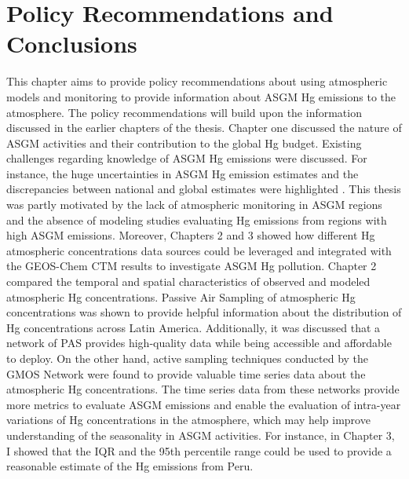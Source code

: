 
\chapter{Policy Recommendations and Conclusions}
\begin{flushleft}
    

This chapter aims to provide policy recommendations about using atmospheric models and monitoring to provide information about ASGM Hg emissions to the atmosphere. The policy recommendations will build upon the information discussed in the earlier chapters of the thesis. Chapter one discussed the nature of ASGM activities and their contribution to the global Hg budget. Existing challenges regarding knowledge of ASGM Hg emissions were discussed. For instance, the huge uncertainties in ASGM Hg emission estimates and the discrepancies between national and global estimates were highlighted \cite{united_nations_environment_programme_technical_2019,agc_reporte_2017}. This thesis was partly motivated by the lack of atmospheric monitoring in ASGM regions and the absence of modeling studies evaluating Hg emissions from regions with high ASGM emissions.
Moreover, Chapters 2 and 3 showed how different Hg atmospheric concentrations data sources could be leveraged and integrated with the GEOS-Chem CTM results to investigate ASGM Hg pollution. Chapter 2 compared the temporal and spatial characteristics of observed and modeled atmospheric Hg concentrations. Passive Air Sampling of atmospheric Hg concentrations was shown to provide helpful information about the distribution of Hg concentrations across Latin America. Additionally, it was discussed that a network of PAS provides high-quality data while being accessible and affordable to deploy\cite{quant_measuring_2021}.  On the other hand, active sampling techniques conducted by the GMOS Network were found to provide valuable time series data about the atmospheric Hg concentrations. The time series data from these networks provide more metrics to evaluate ASGM emissions and enable the evaluation of intra-year variations of Hg concentrations in the atmosphere, which may help improve understanding of the seasonality in ASGM activities. For instance, in Chapter 3, I showed that the IQR and the 95th percentile range could be used to provide a reasonable estimate of the Hg emissions from Peru. 
\end{flushleft}
